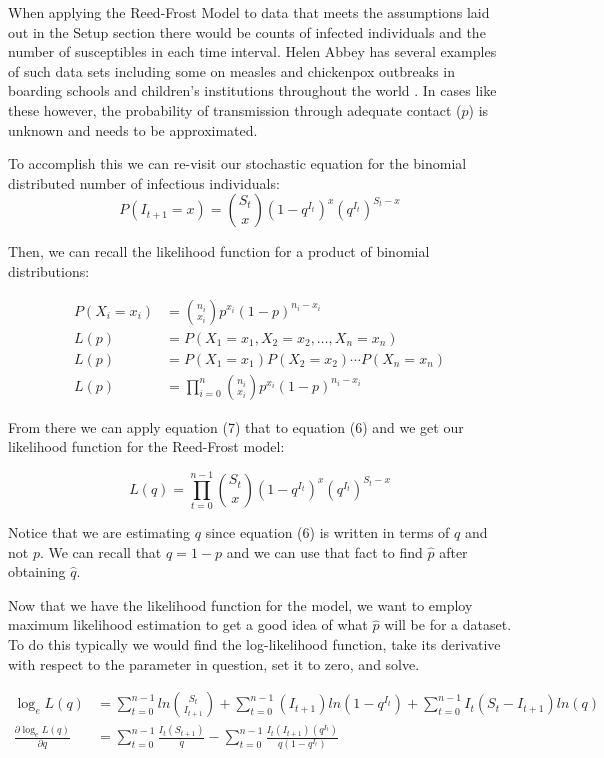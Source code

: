 When applying the Reed-Frost Model to data that meets the assumptions laid out in the Setup section there would be counts of infected individuals and the number of susceptibles in each time interval. Helen Abbey has several examples of such data sets including some on measles and chickenpox outbreaks in boarding schools and children's institutions throughout the world \cite{abbey}. In cases like these however, the probability of transmission through adequate contact ($p$) is unknown and needs to be approximated.

To accomplish this we can re-visit our stochastic equation for the binomial distributed number of infectious individuals:  
\begin{equation}
    P(I_{t+1}= x) = {S_t \choose x} (1-q^{I_t})^x( q^{I_t}) ^{S_t-x}
\end{equation}

Then, we can recall the likelihood function for a product of binomial distributions: 

\begin{align} 
P(X_i= x_i) &= {n_i \choose x_i} p^{x_i}(1-p) ^{n_i-x_i} \nonumber\\
L(p) &= P(X_1= x_1, X_2= x_2,\ldots,X_n= x_n) \nonumber\\
L(p) &= P(X_1= x_1)P(X_2= x_2)\cdots P(X_n= x_n) \nonumber\\
L(p) &= \prod_{i=0}^{n} {n_i \choose x_i} p^{x_i}(1-p) ^{n_i-x_i}
\end{align}

From there we can apply equation (7) that to equation (6) and we get our likelihood function for the Reed-Frost model:

\begin{equation}
    L(q)=\prod_{t=0}^{n-1} {S_t \choose x} (1-q^{I_t})^x( q^{I_t}) ^{S_t-x}
\end{equation}

Notice that we are estimating $q$ since equation (6) is written in terms of $q$ and not $p$. We can recall that $q=1-p$ and we can use that fact to find $\hat{p}$ after obtaining $\hat{q}$.

Now that we have the likelihood function for the model, we want to employ maximum likelihood estimation to get a good idea of what $\hat{p}$ will be for a dataset. To do this typically we would find the log-likelihood function, take its derivative with respect to the parameter in question, set it to zero, and solve.  

\begin{align*}
    \log_{e} L(q) &= \sum_{t=0}^{n-1} ln {S_t \choose I_{t+1}}+ \sum_{t=0}^{n-1} (I_{t+1})ln(1-q^{I_t})+\sum_{t=0}^{n-1} I_t (S_t-I_{t+1})ln(q) \\
    \frac{\partial \log_{e} L(q)}{\partial q} &= \sum_{t=0}^{n-1} \frac{I_t(S_{t+1})}{q}-\sum_{t=0}^{n-1} \frac{I_t(I_{t+1})(q^{I_t})}{q(1-q^{I_t})}
\end{align*}

